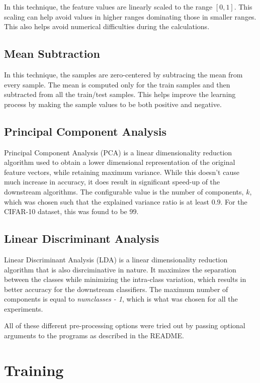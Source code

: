 \documentclass[12pt]{article}
\begin{document}
In this technique, the feature values are linearly scaled to the range $[0, 1]$. This scaling can help avoid values in higher ranges dominating those in smaller ranges. This also helps avoid numerical difficulties during the calculations.

\subsection*{Mean Subtraction}

In this technique, the samples are zero-centered by subtracing the mean from every sample. The mean is computed only for the train samples and then subtracted from all the train/test samples. This helps improve the learning process by making the sample values to be both positive and negative.

\subsection*{Principal Component Analysis}

Principal Component Analysis (PCA) is a linear dimensionality reduction algorithm used to obtain a lower dimensional representation of the original feature vectors, while retaining maximum variance. While this doesn't cause much increase in accuracy, it does result in significant speed-up of the downstream algorithms. The configurable value is the number of components, $k$, which was chosen such that the explained variance ratio is at least $0.9$. For the CIFAR-10 dataset, this was found to be $99$.

\subsection*{Linear Discriminant Analysis}
Linear Discriminant Analysis (LDA) is a linear dimensionality reduction algorithm that is also disrciminative in nature. It maximizes the separation between the classes while minimizing the intra-class variation, which results in better accuracy for the downstream classifiers. The maximum number of components is equal to \textit{numclasses - 1}, which is what was chosen for all the experiments.

\vspace{1em}
\noindent All of these different pre-processing options were tried out by passing optional arguments to the programs as described in the README.

\section*{Training}
\end{document}

